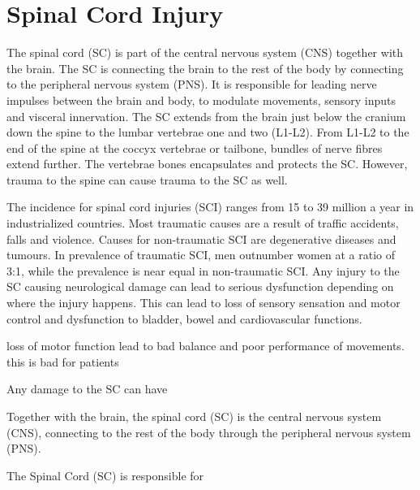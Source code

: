 
\section{Spinal Cord Injury}

The spinal cord (SC) is part of the central nervous system (CNS) together with the brain. The SC is connecting the brain to the rest of the body by connecting to the peripheral nervous system (PNS). It is responsible for leading nerve impulses between the brain and body, to modulate movements, sensory inputs and visceral innervation. The SC extends from the brain just below the cranium down the spine to the lumbar vertebrae one and two (L1-L2). From L1-L2 to the end of the spine at the coccyx vertebrae or tailbone, bundles of nerve fibres extend further. The vertebrae bones encapsulates and protects the SC. However, trauma to the spine can cause trauma to the SC as well. \cite{Weidner2017}

The incidence for spinal cord injuries (SCI) ranges from 15 to 39 million a year in industrialized countries. Most traumatic causes are a result of traffic accidents, falls and violence. Causes for non-traumatic SCI are degenerative diseases and tumours. In prevalence of traumatic SCI, men outnumber women at a ratio of 3:1, while the prevalence is near equal in non-traumatic SCI. Any injury to the SC causing neurological damage can lead to serious dysfunction depending on where the injury happens. This can lead to loss of sensory sensation and motor control and dysfunction to bladder, bowel and cardiovascular functions. 

loss of motor function lead to bad balance and poor performance of movements. this is bad for patients



Any damage to the SC can have 


Together with the brain, the spinal cord (SC) is the central nervous system (CNS), connecting to the rest of the body through the peripheral nervous system (PNS). 

The Spinal Cord (SC) is responsible for 



